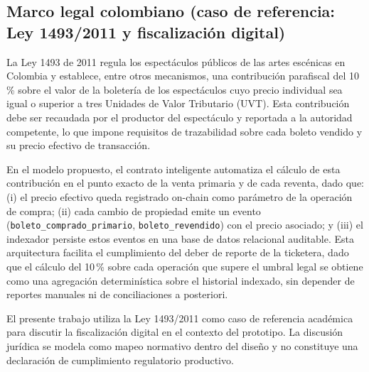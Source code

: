 \subsection{Marco legal colombiano (caso de referencia: Ley 1493/2011 y fiscalización digital)}

La Ley 1493 de 2011 regula los espectáculos públicos de las artes escénicas en Colombia y establece, entre otros mecanismos, una contribución parafiscal del 10\,\% sobre el valor de la boletería de los espectáculos cuyo precio individual sea igual o superior a tres Unidades de Valor Tributario (UVT). Esta contribución debe ser recaudada por el productor del espectáculo y reportada a la autoridad competente, lo que impone requisitos de trazabilidad sobre cada boleto vendido y su precio efectivo de transacción.

En el modelo propuesto, el contrato inteligente automatiza el cálculo de esta contribución en el punto exacto de la venta primaria y de cada reventa, dado que: (i) el precio efectivo queda registrado on-chain como parámetro de la operación de compra; (ii) cada cambio de propiedad emite un evento (\texttt{boleto\_comprado\_primario}, \texttt{boleto\_revendido}) con el precio asociado; y (iii) el indexador persiste estos eventos en una base de datos relacional auditable. Esta arquitectura facilita el cumplimiento del deber de reporte de la ticketera, dado que el cálculo del 10\,\% sobre cada operación que supere el umbral legal se obtiene como una agregación determinística sobre el historial indexado, sin depender de reportes manuales ni de conciliaciones a posteriori.

El presente trabajo utiliza la Ley 1493/2011 como caso de referencia académica para discutir la fiscalización digital en el contexto del prototipo. La discusión jurídica se modela como mapeo normativo dentro del diseño y no constituye una declaración de cumplimiento regulatorio productivo.
